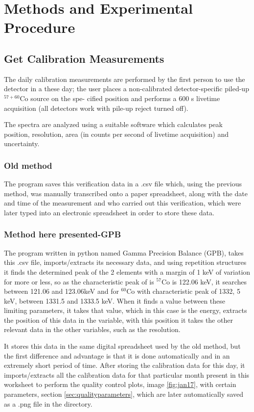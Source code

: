 \documentclass[fleqn,usenatbib]{rasti}
\begin{document}
\section{Methods and Experimental Procedure}
\subsection{Get Calibration Measurements}

The daily calibration measurements are performed by the first person to use the detector in a these day; the user places a non-calibrated detector-specific piled-up $^{57+60}$Co source on the spe- cified position and performs a 600 s livetime acquisition (all detectors work with pile-up reject turned off). 

The spectra are analyzed using a suitable software \citep{canberra1999} which calculates peak position, resolution, area (in counts per second of livetime acquisition) and uncertainty\citep{zahn2017long}.

\subsubsection{Old method}
The program saves this verification data in a .csv file which, using the previous method, was manually transcribed onto a paper spreadsheet, along with the date and time of the measurement and who carried out this verification, which were later typed into an electronic spreadsheet in order to store these data.

\subsubsection{Method here presented-GPB}
The program written in python named Gamma Precision Balance (GPB), takes this .csv file, imports/extracts its necessary data, and using repetition structures it finds the determined peak of the 2 elements with a margin of 1 keV of variation for more or less, so as the characteristic peak of is $^{57}$Co is 122.06 keV, it searches between 121.06 and 123.06keV and for $^{60}$Co with characteristic peak of 1332, 5 keV, between 1331.5 and 1333.5 keV. When it finds a value between these limiting parameters, it takes that value, which in this case is the energy, extracts the position of this data in the variable, with this position it takes the other relevant data in the other variables, such as the resolution.

It stores this data in the same digital spreadsheet used by the old method, but the first difference and advantage is that it is done automatically and in an extremely short period of time. After storing the calibration data for this day, it imports/extracts all the calibration data for that particular month present in this worksheet to perform the quality control plots, image \ref{fig:jan17}, with certain parameters, section \ref{sec:qualityparameters}, which are later automatically saved as a .png file in the directory.
\end{document}
